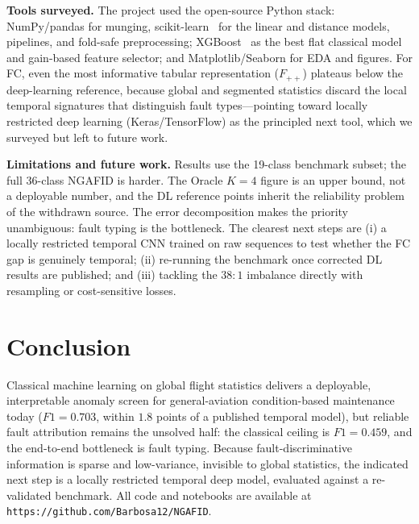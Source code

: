 \documentclass[conference]{IEEEtran}
\begin{document}
\textbf{Tools surveyed.} The project used the open-source Python stack:
NumPy/pandas for munging, scikit-learn~\cite{sklearn2011} for the linear and
distance models, pipelines, and fold-safe preprocessing; XGBoost~\cite{xgboost2016}
as the best flat classical model and gain-based feature selector; and
Matplotlib/Seaborn for EDA and figures. For FC, even the most informative tabular
representation ($F_{++}$) plateaus below the deep-learning reference, because
global and segmented statistics discard the local temporal signatures that
distinguish fault types---pointing toward locally restricted deep learning
(Keras/TensorFlow) as the principled next tool, which we surveyed but left to
future work.

\textbf{Limitations and future work.} Results use the 19-class benchmark subset;
the full 36-class NGAFID is harder. The Oracle $K{=}4$ figure is an upper bound,
not a deployable number, and the DL reference points inherit the reliability
problem of the withdrawn source. The error decomposition makes the priority
unambiguous: fault typing is the bottleneck. The clearest next steps are (i) a
locally restricted temporal CNN trained on raw sequences to test whether the FC
gap is genuinely temporal; (ii) re-running the benchmark once corrected DL results
are published; and (iii) tackling the $38{:}1$ imbalance directly with resampling
or cost-sensitive losses.

\section{Conclusion}
\label{sec:conclusion}
Classical machine learning on global flight statistics delivers a deployable,
interpretable anomaly screen for general-aviation condition-based maintenance
today ($F1=0.703$, within $1.8$ points of a published temporal model), but
reliable fault attribution remains the unsolved half: the classical ceiling is
$F1=0.459$, and the end-to-end bottleneck is fault typing. Because
fault-discriminative information is sparse and low-variance, invisible to global
statistics, the indicated next step is a locally restricted temporal deep model,
evaluated against a re-validated benchmark. All code and notebooks are available
at \texttt{https://github.com/Barbosa12/NGAFID}.



\end{document}
